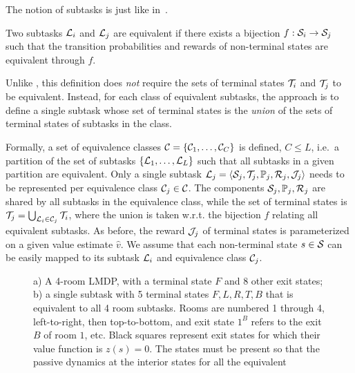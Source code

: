 The notion of subtasks is just like in~\citep{Wen2020}.
\begin{definition}
Two subtasks $\mathcal{L}_i$ and $\mathcal{L}_j$ are equivalent if there exists a bijection $f:\mathcal{S}_i\rightarrow\mathcal{S}_j$ such that the transition probabilities and rewards of non-terminal states are equivalent through $f$.
\end{definition}
Unlike \citep{Wen2020}, this definition does {\em not} require the sets of terminal states $\mathcal{T}_i$ and $\mathcal{T}_j$ to be equivalent. Instead, for each class of equivalent subtasks, the approach is to define a single subtask whose set of terminal states is the {\em union} of the sets of terminal states of subtasks in the class.

Formally, a set of equivalence classes $\mathcal{C}=\{\mathcal{C}_1,\ldots,\mathcal{C}_C\}$ is defined, $C\leq L$, i.e.~a partition of the set of subtasks $\{\mathcal{L}_1,\ldots,\mathcal{L}_L\}$ such that all subtasks in a given partition are equivalent. Only a single subtask $\mathcal{L}_j=\langle\mathcal{S}_j,\mathcal{T}_j,\mathbb{P}_j,\mathcal{R}_j,\mathcal{J}_j\rangle$ needs to be represented per equivalence class $\mathcal{C}_j\in\mathcal{C}$. The components $\mathcal{S}_j,\mathbb{P}_j,\mathcal{R}_j$ are shared by all subtasks in the equivalence class, while the set of terminal states is $\mathcal{T}_j=\bigcup_{\mathcal{L}_i\in\mathcal{C}_j} \mathcal{T}_i$, where the union is taken w.r.t. the bijection $f$ relating all equivalent subtasks. As before, the reward $\mathcal{J}_j$ of terminal states is parameterized on a given value estimate $\widehat{v}$. We assume that each non-terminal state $s\in\mathcal{S}$ can be easily mapped to its subtask $\mathcal{L}_i$ and equivalence class $\mathcal{C}_j$.


\begin{figure}[!t]
    \centering
    \begin{adjustbox}{width=0.55\columnwidth}
        
    \end{adjustbox}
    \hfill
    \begin{adjustbox}{width=0.35\columnwidth}
        
    \end{adjustbox}
\caption{a) A 4-room LMDP, with a terminal state $F$ and 8 other exit states; b) a single subtask with 5 terminal states $F,L,R,T,B$ that is equivalent to all 4 room subtasks. Rooms are numbered 1 through 4, left-to-right, then top-to-bottom, and exit state $1^B$ refers to the exit $B$ of room $1$, etc. Black squares represent exit states for which their value function is $z(s)=0$. The states must be present so that the passive dynamics at the interior states for all the equivalent}
\label{fig:ex}
\end{figure}




